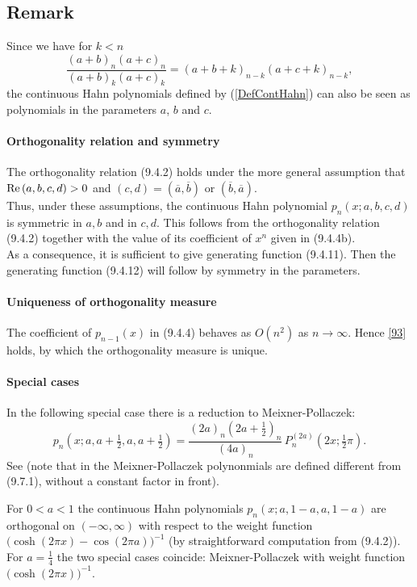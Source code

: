 \documentclass[envcountchap,graybox]{svmono}
\newcounter{rom}
\newcommand\thalf{\tfrac12}
\newcommand\iy\infty
\renewcommand\Re{{\rm Re}\,}
\begin{document}
\subsection*{Remark}
Since we have for $k<n$
$$\frac{(a+b)_n(a+c)_n}{(a+b)_k(a+c)_k}=(a+b+k)_{n-k}(a+c+k)_{n-k},$$
the continuous Hahn polynomials defined by (\ref{DefContHahn}) can also be seen as polynomials
in the parameters $a$, $b$ and $c$.
\label{sec9.4}
%
\paragraph{Orthogonality relation and symmetry}
The orthogonality relation (9.4.2) holds under the more general assumption that
$\Re(a,b,c,d)>0$ and $(c,d)=(\overline a,\overline b)$ or $(\overline b,\overline a)$.\\
Thus, under these assumptions, the continuous Hahn polynomial
$p_n(x;a,b,c,d)$
is symmetric in $a,b$ and in $c,d$.
This follows from the orthogonality relation (9.4.2)
together with the value of its coefficient of $x^n$ given in (9.4.4b).\\
As a consequence, it is sufficient to give generating function (9.4.11). Then the generating
function (9.4.12) will follow by symmetry in the parameters.
%
\paragraph{Uniqueness of orthogonality measure}
The coefficient of $p_{n-1}(x)$ in (9.4.4) behaves as $O(n^2)$ as $n\to\iy$.
Hence \eqref{93} holds, by which the orthogonality measure is unique.
%
\paragraph{Special cases}
In the following special case there is a reduction to
Meixner-Pollaczek:
\begin{equation}
p_n(x;a,a+\thalf,a,a+\thalf)=
\frac{(2a)_n (2a+\thalf)_n}{(4a)_n}\,P_n^{(2a)}(2x;\thalf\pi).
\end{equation}
See  (note that in  the
Meixner-Pollaczek polynonmials are defined different from (9.7.1),
without a constant factor in front).

For $0<a<1$ the continuous Hahn polynomials $p_n(x;a,1-a,a,1-a)$
are orthogonal on $(-\iy,\iy)$ with respect to the weight function
$\big(\cosh(2\pi x)-\cos(2\pi a)\big)^{-1}$
(by straightforward computation from (9.4.2)).
For $a=\tfrac14$ the two special cases coincide:
Meixner-Pollaczek with weight function $\big(\cosh(2\pi x)\big)^{-1}$.
%
\end{document}
